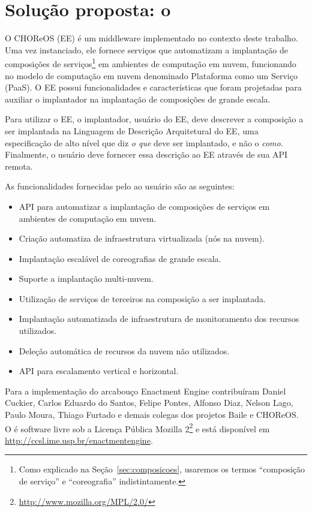 \chapter{Solução proposta: o \ee}
\label{cap:solucao}

O CHOReOS \ee (EE) é um middleware implementado no contexto deste trabalho.
Uma vez instanciado, ele fornece serviços que automatizam
a implantação de composições de serviços\footnote{Como explicado na Seção~\ref{sec:composicoes}, usaremos os termos 
``composição de serviço'' e ``coreografia'' indistintamente.} 
em ambientes de computação em nuvem,
funcionando no modelo de computação em nuvem denominado Plataforma como um Serviço (PaaS).
O EE possui funcionalidades e características que foram projetadas para auxiliar o
implantador na implantação de composições de grande escala.

Para utilizar o EE, o implantador, usuário do EE, deve descrever a composição a ser implantada
na Linguagem de Descrição Arquitetural do EE, uma especificação de alto nível que
diz \emph{o que} deve ser implantado, e não o \emph{como}. 
Finalmente, o usuário deve fornecer essa descrição ao EE através de sua API remota.

As funcionalidades fornecidas pelo \ee ao usuário são as seguintes:

\begin{itemize}
\item API para automatizar a implantação de composições de serviços em ambientes de computação em nuvem.
\item Criação automatiza de infraestrutura virtualizada (nós na nuvem).
\item Implantação escalável de coreografias de grande escala.
\item Suporte a implantação multi-nuvem.
\item Utilização de serviços de terceiros na composição a ser implantada.
\item Implantação automatizada de infraestrutura de monitoramento dos recursos utilizados.
\item Deleção automática de recursos da nuvem não utilizados.
\item API para escalamento vertical e horizontal.
\end{itemize}

Para a implementação do arcabouço Enactment Engine contribuíram Daniel Cuckier, Carlos Eduardo do Santos, Felipe Pontes, Alfonso Diaz, Nelson Lago, Paulo Moura, Thiago Furtado e demais colegas dos projetos Baile e CHOReOS. O \ee é software livre 
sob a Licença Pública Mozilla 2\footnote{\url{http://www.mozilla.org/MPL/2.0/}} 
e está disponível em \url{http://ccsl.ime.usp.br/enactmentengine}. 

